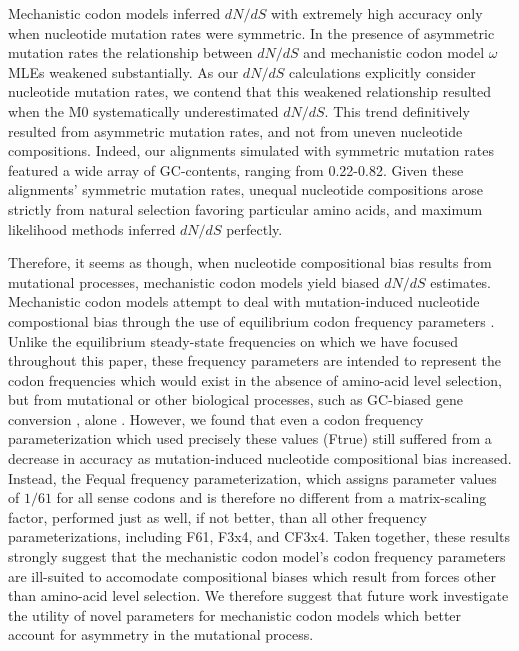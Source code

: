 \documentclass{pnastwo}
\begin{document}
\begin{article}


Mechanistic codon models inferred $dN/dS$ with extremely high accuracy only when nucleotide mutation rates were symmetric. In the presence of asymmetric mutation rates the relationship between $dN/dS$ and mechanistic codon model $\omega$ MLEs weakened substantially. As our $dN/dS$ calculations explicitly consider nucleotide mutation rates, we contend that this weakened relationship resulted when the M0 systematically underestimated $dN/dS$. This trend definitively resulted from asymmetric mutation rates, and not from uneven nucleotide compositions. Indeed, our alignments simulated with symmetric mutation rates featured a wide array of GC-contents, ranging from 0.22-0.82. Given these alignments' symmetric mutation rates, unequal nucleotide compositions arose strictly from natural selection favoring particular amino acids, and maximum likelihood methods inferred $dN/dS$ perfectly.

Therefore, it seems as though, when nucleotide compositional bias results from mutational processes, mechanistic codon models yield biased $dN/dS$ estimates. Mechanistic codon models attempt to deal with mutation-induced nucleotide compostional bias through the use of equilibrium codon frequency parameters \cite{Yang2006}. Unlike the equilibrium steady-state frequencies on which we have focused throughout this paper, these frequency parameters are intended to represent the codon frequencies which would exist in the absence of amino-acid level selection, but from mutational or other biological processes, such as GC-biased gene conversion \cite{DuretGaltier2009,WebsterHurst2012}, alone \cite{GoldmanYang1994,MuseGaut1994,YN00,Yang2006}. 
However, we found that even a codon frequency parameterization which used precisely these values (Ftrue) still suffered from a decrease in accuracy as mutation-induced nucleotide compositional bias increased. Instead, the Fequal frequency parameterization, which assigns parameter values of $1/61$ for all sense codons and is therefore no different from a matrix-scaling factor, performed just as well, if not better, than all other frequency parameterizations, including F61, F3x4, and CF3x4. Taken together, these results strongly suggest that the mechanistic codon model's codon frequency parameters are ill-suited to accomodate compositional biases which result from forces other than amino-acid level selection. We therefore suggest that future work investigate the utility of novel parameters for mechanistic codon models which better account for asymmetry in the mutational process.



\end{article}
\end{document}
